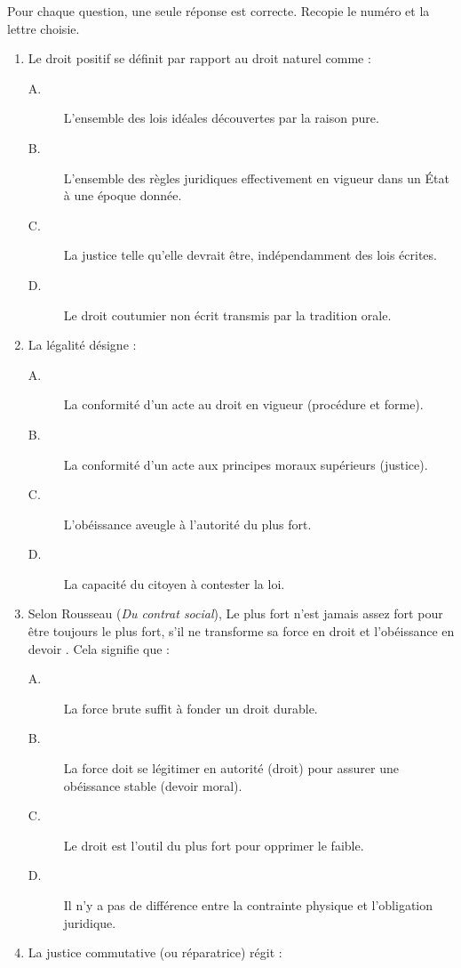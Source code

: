\documentclass[11pt]{article}
\newcommand{\cle}[1]{{\popxbold\color{popdark}#1}}
\begin{document}
\begin{exercice}
Pour chaque question, une seule réponse est correcte. Recopie le numéro et la lettre choisie.
\begin{enumerate}
    \item Le \cle{droit positif} se définit par rapport au droit naturel comme :
    \begin{description}
        \item[A.] L'ensemble des lois idéales découvertes par la raison pure.
        \item[B.] L'ensemble des règles juridiques effectivement en vigueur dans un État à une époque donnée.
        \item[C.] La justice telle qu'elle devrait être, indépendamment des lois écrites.
        \item[D.] Le droit coutumier non écrit transmis par la tradition orale.
    \end{description}
    \item La \cle{légalité} désigne :
    \begin{description}
        \item[A.] La conformité d'un acte au droit en vigueur (procédure et forme).
        \item[B.] La conformité d'un acte aux principes moraux supérieurs (justice).
        \item[C.] L'obéissance aveugle à l'autorité du plus fort.
        \item[D.] La capacité du citoyen à contester la loi.
    \end{description}
    \item Selon \cle{Rousseau} (\emph{Du contrat social}), \guillemotleft Le plus fort n'est jamais assez fort pour être toujours le plus fort, s'il ne transforme sa force en droit et l'obéissance en devoir \guillemotright. Cela signifie que :
    \begin{description}
        \item[A.] La force brute suffit à fonder un droit durable.
        \item[B.] La force doit se légitimer en autorité (droit) pour assurer une obéissance stable (devoir moral).
        \item[C.] Le droit est l'outil du plus fort pour opprimer le faible.
        \item[D.] Il n'y a pas de différence entre la contrainte physique et l'obligation juridique.
    \end{description}
    \item La \cle{justice commutative} (ou réparatrice) régit :

\end{enumerate}
\end{exercice}
\end{document}
